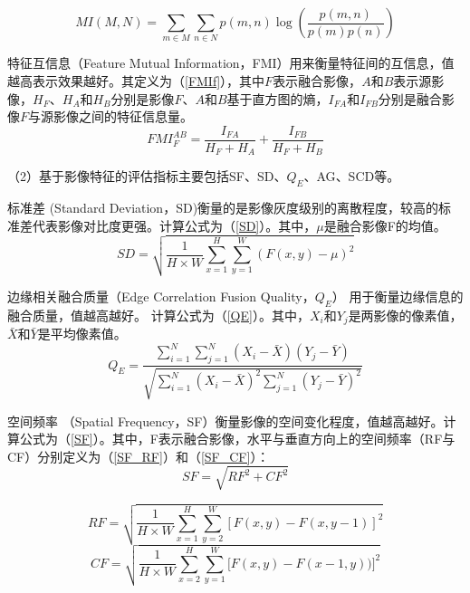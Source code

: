 \begin{equation}\label{MI}
M I(M, N)=\sum_{m \in M} \sum_{n \in N} p(m, n) \log \left(\frac{p(m, n)}{p(m) p(n)}\right)
\end{equation}

特征互信息（Feature Mutual Information，FMI）用来衡量特征间的互信息，值越高表示效果越好\cite{haghighat2011non}。其定义为（\ref{FMIf}），其中$F$表示融合影像，$A$和$B$表示源影像，$H_{F}$、$H_{A}$和$H_{B}$分别是影像$F$、$A$和$B$基于直方图的熵，$I_{FA}$和$I_{FB}$分别是融合影像$F$与源影像之间的特征信息量。
\begin{equation}\label{FMIf}
FMI_{F}^{AB}=\frac{I_{FA}}{H_{F}+H_{A}}+\frac{I_{FB}}{H_{F}+H_{B}}
\end{equation}



（2）基于影像特征的评估指标主要包括SF\cite{eskicioglu1995image}、SD\cite{shi2005wavelet}、$Q_E$\cite{piella2003new}、AG\cite{wu2005remote}、SCD\cite{Aslantas2015A}等。

标准差 (Standard Deviation，SD)衡量的是影像灰度级别的离散程度，较高的标准差代表影像对比度更强\cite{shi2005wavelet}。计算公式为（\ref{SD}）。其中，$\mu$是融合影像F的均值。
\begin{equation}\label{SD}
SD=\sqrt{\dfrac{1}{H\times W}\sum_{x=1}^{H}\sum_{y=1}^{W}\left(F(x,y)-\mu\right)^{2}}
\end{equation}

边缘相关融合质量（Edge Correlation Fusion Quality，$Q_E$） 用于衡量边缘信息的融合质量，值越高越好\cite{piella2003new}。 计算公式为（\ref{QE}）。其中，$X_i$和$Y_j$是两影像的像素值，$\bar{X}$和$\bar{Y}$是平均像素值。
\begin{equation}\label{QE}
Q_E=\frac{\sum_{i=1}^N \sum_{j=1}^N\left(X_i-\bar{X}\right)\left(Y_j-\bar{Y}\right)}{\sqrt{\sum_{i=1}^N\left(X_i-\bar{X}\right)^2 \sum_{j=1}^N\left(Y_j-\bar{Y}\right)^2}}
\end{equation}

空间频率 （Spatial Frequency，SF）衡量影像的空间变化程度，值越高越好\cite{eskicioglu1995image}。计算公式为（\ref{SF}）。其中，F表示融合影像，水平与垂直方向上的空间频率（RF与CF）分别定义为（\ref{SF_RF}）和（\ref{SF_CF}）：
\begin{equation}\label{SF}
SF=\sqrt{RF^{2}+CF^{2}}
\end{equation}

\begin{equation}\label{SF_RF}
RF=\sqrt{\dfrac{1}{H\times W}\sum_{x=1}^{H}\sum_{y=2}^{W}\left[F(x,y)-F(x,y-1)\right]^2}\end{equation}
\begin{equation}\label{SF_CF}
CF=\sqrt{\dfrac{1}{H\times W}\sum_{x=2}^{H}\sum_{y=1}^{W}\bigl[F(x,y)-F(x-1,y)\bigr)\bigr]^2}\end{equation}

